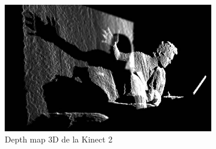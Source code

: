 \begin{figure}[H]
  \begin{center}
    \includegraphics[width=350px]{images/kyle_kinect.jpg}
    \caption{Depth map 3D de la Kinect 2}
    \label{fig:depthMap}
  \end{center}
\end{figure}

